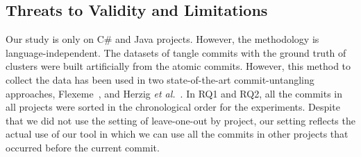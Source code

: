\subsection{Threats to Validity and Limitations}
\label{threats:sec}

 Our study is only on C\# and
Java projects. However, the methodology is language-independent. The
datasets of tangle commits with the ground truth of clusters were
built artificially from the atomic commits. However, this method to
collect the data has been used in two state-of-the-art
commit-untangling approaches, Flexeme~\cite{flexeme-fse20}, and Herzig
{\em et al.}~\cite{kim-msr13}. In RQ1 and RQ2, all the commits in all
projects were sorted in the chronological order for the
experiments. Despite that we did not use the setting of leave-one-out
by project, our setting reflects the actual use of our tool in which
we can use all the commits in other projects that occurred before the
current commit.


